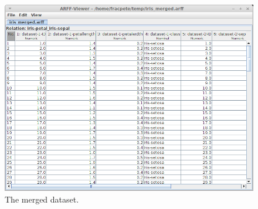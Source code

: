 \begin{figure}[htb]
  \centering
  \includegraphics[width=12.0cm]{images/merge_datasets-output.png}
  \caption{The merged dataset.}
  \label{merge_datasets-output}
\end{figure}
